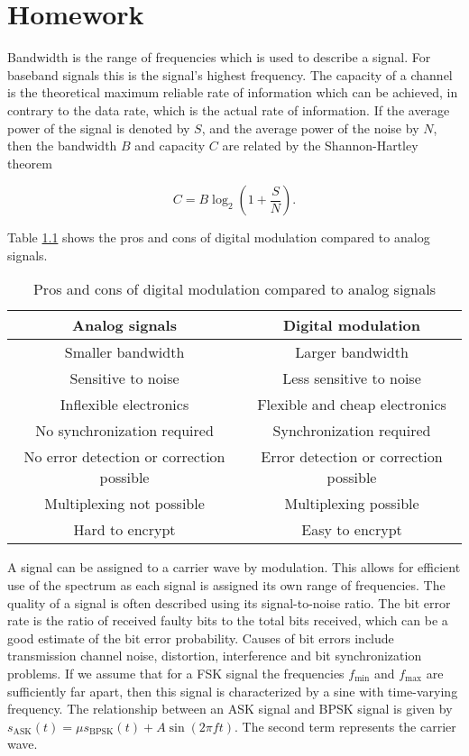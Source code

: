 \documentclass[11pt,titlepage]{report}
\begin{document}
\chapter{Homework}
Bandwidth is the range of frequencies which is used to describe a signal. For baseband signals this is the signal's highest frequency. The capacity of a channel is the  theoretical maximum reliable rate of information which can be achieved, in contrary to the data rate, which is the actual rate of information. If the average power of the signal is denoted by $S$, and the average power of the noise by $N$, then the bandwidth $B$ and capacity $C$ are related by the Shannon-Hartley theorem

\begin{equation}
	C=B \log_2{\left(1+\frac{S}{N}\right)}.
\end{equation}

Table \ref{tab:pros-cons} shows the pros and cons of digital modulation compared to analog signals.

\begin{table}[H]
	\centering
	\caption{Pros and cons of digital modulation compared to analog signals}
	\label{tab:pros-cons}
	\begin{tabular}{c c}
		\hline\hline
		Analog signals & Digital modulation \\
		\hline
		Smaller bandwidth & Larger bandwidth \\
		Sensitive to noise & Less sensitive to noise \\
		Inflexible electronics & Flexible and cheap electronics \\
		No synchronization required & Synchronization required \\
		No error detection or correction possible & Error detection or correction possible \\
		Multiplexing not possible & Multiplexing possible \\
		Hard to encrypt & Easy to encrypt \\
		\hline
	\end{tabular}
\end{table}

A signal can be assigned to a carrier wave by modulation. This allows for efficient use of the spectrum as each signal is assigned its own range of frequencies. The quality of a signal is often described using its signal-to-noise ratio. The bit error rate is the ratio of received faulty bits to the total bits received, which can be a good estimate of the bit error probability. Causes of bit errors include transmission channel noise, distortion, interference and bit synchronization problems. If we assume that for a FSK signal the frequencies $f_{\text{min}}$ and $f_{\text{max}}$ are sufficiently far apart, then this signal is characterized by a sine with time-varying frequency. The relationship between an ASK signal and BPSK signal is given by $s_{\text{ASK}}(t) = \mu s_{\text{BPSK}}(t) + A \sin{(2 \pi f t)}$. The second term represents the carrier wave.
\end{document}
